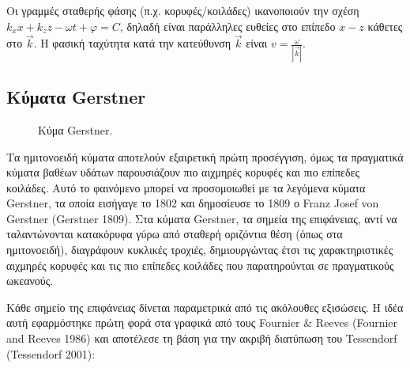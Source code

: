 Οι γραμμές σταθερής φάσης (π.χ. κορυφές/κοιλάδες) ικανοποιούν την σχέση
\(k_x x + k_z z - \omega t + \varphi = C\), δηλαδή είναι παράλληλες
ευθείες στο επίπεδο \(x\!-\!z\) κάθετες στο \(\vec{k}\). Η φασική
ταχύτητα κατά την κατεύθυνση \(\vec{k}\) είναι
\(v=\frac{\omega}{|\vec{k}|}\).

\subsection{Κύματα
Gerstner}\label{ux3baux3cdux3bcux3b1ux3c4ux3b1-gerstner}

\begin{figure}\vspace*{-1\baselineskip}
\centering
{}
\caption{Κύμα Gerstner.}
\label{fig:gerstner}
\end{figure}
Τα ημιτονοειδή κύματα αποτελούν εξαιρετική πρώτη προσέγγιση, όμως τα
πραγματικά κύματα βαθέων υδάτων παρουσιάζουν πιο αιχμηρές κορυφές και
πιο επίπεδες κοιλάδες. Αυτό το φαινόμενο μπορεί να προσομοιωθεί με τα
λεγόμενα κύματα Gerstner, τα οποία εισήγαγε το 1802 και δημοσίευσε το
1809 ο Franz Josef von Gerstner (Gerstner 1809). Στα κύματα Gerstner, τα
σημεία της επιφάνειας, αντί να ταλαντώνονται κατακόρυφα γύρω από σταθερή
οριζόντια θέση (όπως στα ημιτονοειδή), διαγράφουν κυκλικές τροχιές,
δημιουργώντας έτσι τις χαρακτηριστικές αιχμηρές κορυφές και τις πιο
επίπεδες κοιλάδες που παρατηρούνται σε πραγματικούς ωκεανούς.


Κάθε σημείο της επιφάνειας δίνεται παραμετρικά από τις ακόλουθες
εξισώσεις. Η ιδέα αυτή εφαρμόστηκε πρώτη φορά στα γραφικά από τους
Fournier \& Reeves (Fournier and Reeves 1986) και αποτέλεσε τη βάση για
την ακριβή διατύπωση του Tessendorf (Tessendorf 2001):

